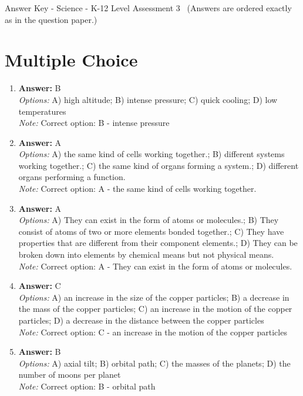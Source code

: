 \documentclass[12pt]{article}
\begin{document}
\begin{center}
Answer Key - Science - K-12 Level Assessment 3 \
\small (Answers are ordered exactly as in the question paper.)
\end{center}

\section*{Multiple Choice}
\begin{enumerate}[label=\arabic*.]
\item \textbf{Answer:} B
\\ \textit{Options:} A) high altitude; B) intense pressure; C) quick cooling; D) low temperatures
\\ \textit{Note:} Correct option: B - intense pressure
\item \textbf{Answer:} A
\\ \textit{Options:} A) the same kind of cells working together.; B) different systems working together.; C) the same kind of organs forming a system.; D) different organs performing a function.
\\ \textit{Note:} Correct option: A - the same kind of cells working together.
\item \textbf{Answer:} A
\\ \textit{Options:} A) They can exist in the form of atoms or molecules.; B) They consist of atoms of two or more elements bonded together.; C) They have properties that are different from their component elements.; D) They can be broken down into elements by chemical means but not physical means.
\\ \textit{Note:} Correct option: A - They can exist in the form of atoms or molecules.
\item \textbf{Answer:} C
\\ \textit{Options:} A) an increase in the size of the copper particles; B) a decrease in the mass of the copper particles; C) an increase in the motion of the copper particles; D) a decrease in the distance between the copper particles
\\ \textit{Note:} Correct option: C - an increase in the motion of the copper particles
\item \textbf{Answer:} B
\\ \textit{Options:} A) axial tilt; B) orbital path; C) the masses of the planets; D) the number of moons per planet
\\ \textit{Note:} Correct option: B - orbital path
\end{enumerate}
\end{document}
